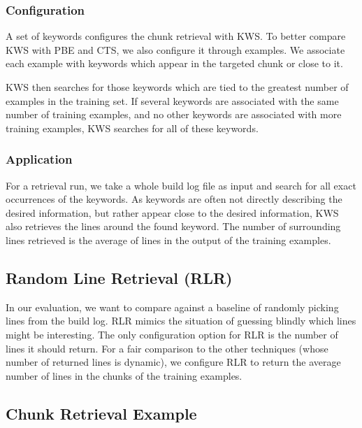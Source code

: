 \subsubsection{Configuration}
A set of keywords configures the chunk retrieval with KWS\@.
To better
compare KWS with PBE and CTS, we also configure it through examples.
We associate each example with keywords which appear in the targeted
chunk or close to it.

KWS then searches for those keywords which are tied to the greatest
number of examples in the training set.
If several keywords are associated with the same number of training
examples, and no other keywords are associated with more training
examples, KWS searches for all of these keywords.

\subsubsection{Application}
For a retrieval run, we take a whole build log file as input and
search for all exact occurrences of the keywords.
As keywords are
often not directly describing the desired information, but rather
appear close to the desired information, KWS also retrieves the lines
around the found keyword.
The number of surrounding lines retrieved is
the average of lines in the output of the training examples.


\subsection{Random Line Retrieval (RLR)}
\label{sec:expl-rlr}
In our evaluation, we want to compare against a baseline of randomly
picking lines from the build log.
RLR mimics the
situation of guessing blindly which lines might be interesting.
The only configuration option for RLR is the number of lines it should
return.
For a fair comparison to the other techniques (whose number of
returned lines is dynamic), we configure RLR to return the average
number of lines in the chunks of the training examples.


\subsection{Chunk Retrieval Example}
\label{sec:crt-example}

